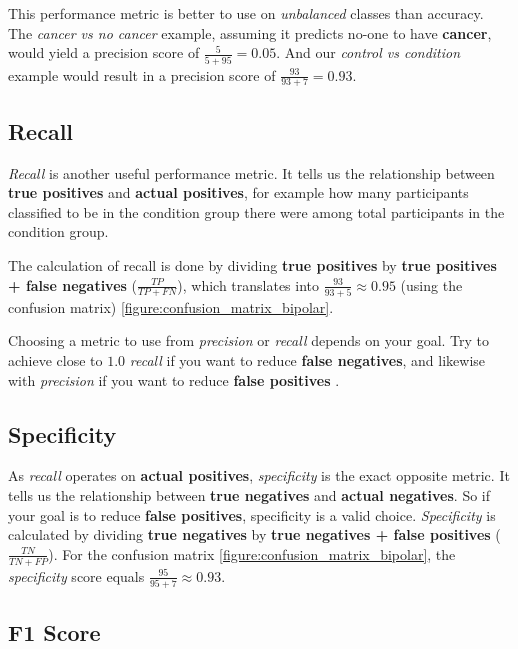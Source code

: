 This performance metric is better to use on \textit{unbalanced} classes than accuracy. The \textit{cancer vs no cancer} example, assuming it predicts no-one to have \textbf{cancer}, would yield a precision score of $ \frac{5}{5+95} = 0.05 $. And our \textit{control vs condition} example would result in a precision score of $ \frac{93}{93+7} = 0.93 $.

\subsection{Recall}

\textit{Recall} is another useful performance metric. It tells us the relationship between \textbf{true positives} and \textbf{actual positives}, for example how many participants classified to be in the condition group there were among total participants in the condition group.

The calculation of recall is done by dividing \textbf{true positives} by \textbf{true positives + false negatives} ($ \frac{TP}{TP+FN} $), which translates into $ \frac{93}{93+5} \approx 0.95 $ (using the confusion matrix) \ref{figure:confusion_matrix_bipolar}.

Choosing a metric to use from \textit{precision} or \textit{recall} depends on your goal. Try to achieve close to $ 1.0 $ \textit{recall} if you want to reduce \textbf{false negatives}, and likewise with \textit{precision} if you want to reduce \textbf{false positives} \cite{ml_metrics}.

\subsection{Specificity}

As \textit{recall} operates on \textbf{actual positives}, \textit{specificity} is the exact opposite metric. It tells us the relationship between \textbf{true negatives} and \textbf{actual negatives}. So if your goal is to reduce \textbf{false positives}, specificity is a valid choice. \textit{Specificity} is calculated by dividing \textbf{true negatives} by \textbf{true negatives + false positives} ($ \frac{TN}{TN+FP} $). For the confusion matrix \ref{figure:confusion_matrix_bipolar}, the \textit{specificity} score equals $ \frac{95}{95+7} \approx 0.93 $.

\subsection{F1 Score}

